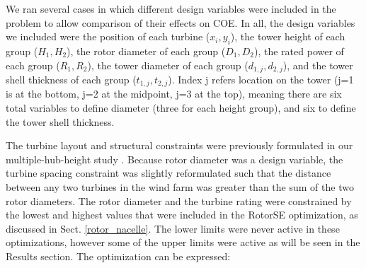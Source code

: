         We ran several cases in which different design variables were included in the problem to allow comparison of their effects on COE. In all, the design variables we included were the position of each turbine ($x_i,y_i$), the tower height of each group ($H_1, H_2$), the rotor diameter of each group ($D_1, D_2$), the rated power of each group ($R_1, R_2$), the tower diameter of each group ($d_{1,j}, d_{2,j}$), and the tower shell thickness of each group ($t_{1,j}, t_{2,j}$). Index j refers location on the tower (j=1 is at the bottom, j=2 at the midpoint, j=3 at the top), meaning there are six total variables to define diameter (three for each height group), and six to define the tower shell thickness.
                
          The turbine layout and structural constraints were previously formulated in our multiple-hub-height study \citep{stanley2018}. Because rotor diameter was a design variable, the turbine spacing constraint was slightly reformulated such that the distance between any two turbines in the wind farm was greater than the sum of the two rotor diameters.
           The rotor diameter and the turbine rating were constrained by the lowest and highest values that were included in the RotorSE optimization, as discussed in Sect. \ref{rotor_nacelle}.
           The lower limits were never active in these optimizations, however some of the upper limits were active as will be seen in the Results section.
       The optimization can be expressed:
        
